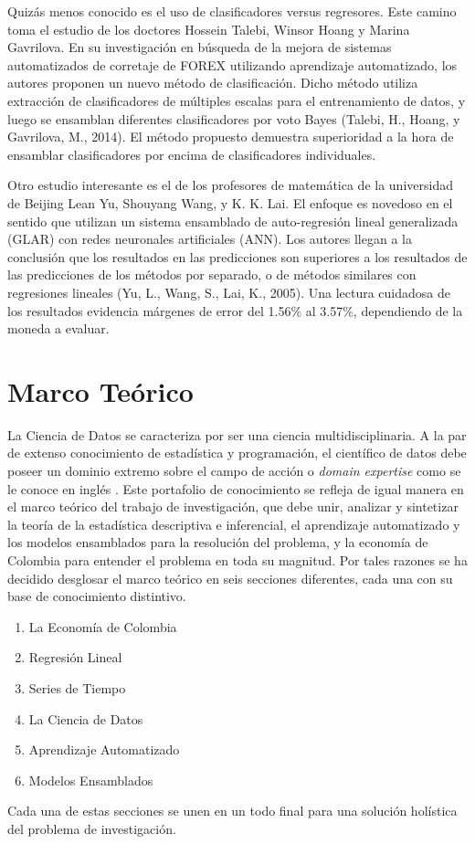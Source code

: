 Quizás menos conocido es el uso de clasificadores versus regresores. Este camino toma el estudio de los doctores Hossein Talebi, Winsor Hoang y Marina Gavrilova. En su investigación en búsqueda de la mejora de sistemas automatizados de corretaje de FOREX utilizando aprendizaje automatizado, los autores proponen un nuevo método de clasificación. Dicho método utiliza extracción de clasificadores de múltiples escalas para el entrenamiento de datos, y luego se ensamblan diferentes clasificadores por voto Bayes (Talebi, H., Hoang, y Gavrilova, M., 2014). El método propuesto demuestra superioridad a la hora de ensamblar clasificadores por encima de clasificadores individuales.

Otro estudio interesante es el de los profesores de matemática de la universidad de Beijing Lean Yu, Shouyang Wang, y K. K. Lai. El enfoque es novedoso en el sentido que utilizan un sistema ensamblado de auto-regresión lineal generalizada (GLAR) con redes neuronales artificiales (ANN). Los autores llegan a la conclusión que los resultados en las predicciones son superiores a los resultados de las predicciones de los métodos por separado, o de métodos similares con regresiones lineales (Yu, L., Wang, S., Lai, K., 2005). Una lectura cuidadosa de los resultados evidencia márgenes de error del 1.56\% al 3.57\%, dependiendo de la moneda a evaluar.

\section{Marco Teórico}
La Ciencia de Datos se caracteriza por ser una ciencia multidisciplinaria. A la par de extenso conocimiento de estadística y programación, el científico de datos debe poseer un dominio extremo sobre el campo de acción o \textit{domain expertise} como se le conoce en inglés \cite{pengMatsui}. Este portafolio de conocimiento se refleja de igual manera en el marco teórico del trabajo de investigación, que debe unir, analizar y sintetizar la teoría de la estadística descriptiva e inferencial, el aprendizaje automatizado y los modelos ensamblados para la resolución del problema, y la economía de Colombia para entender el problema en toda su magnitud. Por tales razones se ha decidido desglosar el marco teórico en seis secciones diferentes, cada una con su base de conocimiento distintivo.

\begin{enumerate}
    \item La Economía de Colombia
    \item Regresión Lineal
    \item Series de Tiempo
    \item La Ciencia de Datos
    \item Aprendizaje Automatizado
    \item Modelos Ensamblados
\end{enumerate}

Cada una de estas secciones se unen en un todo final para una solución holística del problema de investigación.
